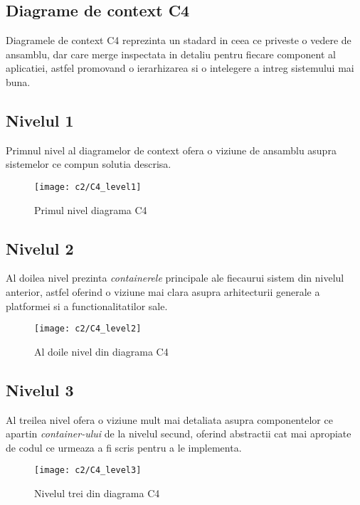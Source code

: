 \subsection*{Diagrame de context C4 }

Diagramele de context C4 reprezinta un stadard in ceea ce priveste o vedere de ansamblu, dar care merge inspectata in detaliu pentru fiecare component al aplicatiei, astfel promovand o ierarhizarea si o intelegere a intreg sistemului mai buna.\\


\subsection*{Nivelul 1}
Primnul nivel al diagramelor de context ofera o viziune de ansamblu asupra sistemelor ce compun solutia descrisa.
\vspace{1cm}
\begin{figure}[h]
	\centering
	
	\texttt{[image: c2/C4\_level1]}
	\caption{Primul nivel diagrama C4}
\end{figure}

\newpage
\subsection*{Nivelul 2}
Al doilea nivel prezinta \textit{containerele} principale ale fiecaurui sistem din nivelul anterior, astfel oferind o viziune mai clara asupra arhitecturii generale a platformei si a functionalitatilor sale.
\vspace{1cm}
\begin{figure}[h]
	\centering
	
	\texttt{[image: c2/C4\_level2]}
	\caption{Al doile nivel din diagrama C4}
\end{figure}

\subsection*{Nivelul 3}
Al treilea nivel ofera o viziune mult mai detaliata asupra componentelor ce apartin \textit{container-ului} de la nivelul secund, oferind abstractii cat mai apropiate de codul ce urmeaza a fi scris pentru a le implementa.

\vspace{1cm}
\begin{figure}[h]
	\centering
	
	\texttt{[image: c2/C4\_level3]}
	\caption{Nivelul trei din diagrama C4}
\end{figure}



